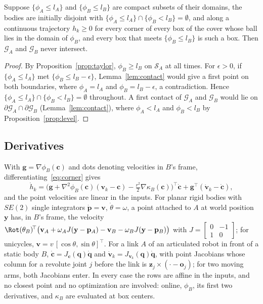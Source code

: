 \begin{theorem}\label{thm:cover}
Suppose $\{\phi_A\le l_A\}$ and $\{\phi_B\le l_B\}$ are compact subsets of their domains, the
bodies are initially disjoint with $\{\phi_A\le l_A\}\cap\{\phi_B<l_B\}=\emptyset$, and along a
continuous trajectory $h_k\ge0$ for every corner of every box of the cover whose ball lies in the
domain of $\phi_B$, and every box that meets $\{\phi_B\le l_B\}$ is such a box. Then $\mathcal G_A$
and $\mathcal G_B$ never intersect.
\end{theorem}
\begin{proof}
By Proposition~\ref{prop:taylor}, $\phi_B\ge l_B$ on $\mathcal S_A$ at all times. For $\epsilon>0$,
if $\{\phi_A\le l_A\}$ met $\{\phi_B\le l_B-\epsilon\}$, Lemma~\ref{lem:contact} would give a first
point on both boundaries, where $\phi_A=l_A$ and $\phi_B=l_B-\epsilon$, a contradiction. Hence
$\{\phi_A\le l_A\}\cap\{\phi_B<l_B\}=\emptyset$ throughout. A first contact of $\mathcal G_A$ and
$\mathcal G_B$ would lie on $\partial\mathcal G_A\cap\partial\mathcal G_B$
(Lemma~\ref{lem:contact}), where $\phi_A<l_A$ and $\phi_B<l_B$ by Proposition~\ref{prop:level}.
\end{proof}

\subsection{Derivatives}
With $\mathbf g=\nabla\phi_B(\mathbf c)$ and dots denoting velocities in $B$'s frame,
differentiating~\eqref{eq:corner} gives
\begin{equation}\label{eq:hdot-cover}
\dot h_k=\big(\mathbf g+\nabla^2\phi_B(\mathbf c)(\mathbf v_k-\mathbf c)
-\tfrac{r^2}{2}\nabla\kappa_B(\mathbf c)\big)^{\!\top}\dot{\mathbf c}
+\mathbf g^\top(\dot{\mathbf v}_k-\dot{\mathbf c}),
\end{equation}
and the point velocities are linear in the inputs. For planar rigid bodies with $SE(2)$ single
integrators $\dot{\mathbf p}=\mathbf v$, $\dot\theta=\omega$, a point attached to $A$ at world position
$\mathbf y$ has, in $B$'s frame, the velocity
$\Rot(\theta_B)^{\!\top}\big(\mathbf v_A+\omega_AJ(\mathbf y-\mathbf p_A)-\mathbf v_B-\omega_BJ(\mathbf y-\mathbf p_B)\big)$
with $J=\left[\begin{smallmatrix}0&-1\\1&0\end{smallmatrix}\right]$; for unicycles,
$\mathbf v=v\,[\cos\theta,\sin\theta]^\top$. For a link $A$ of an articulated robot in front of a
static body $B$, $\dot{\mathbf c}=J_{\mathbf c}(\mathbf q)\dot{\mathbf q}$ and
$\dot{\mathbf v}_k=J_{\mathbf v_k}(\mathbf q)\dot{\mathbf q}$, with point Jacobians whose column for
a revolute joint $j$ before the link is $\mathbf z_j\times(\cdot-\mathbf o_j)$; for two moving arms,
both Jacobians enter. In every case the rows are affine in the inputs, and no closest point and no
optimization are involved: online, $\phi_B$, its first two derivatives, and $\kappa_B$ are evaluated
at box centers.

